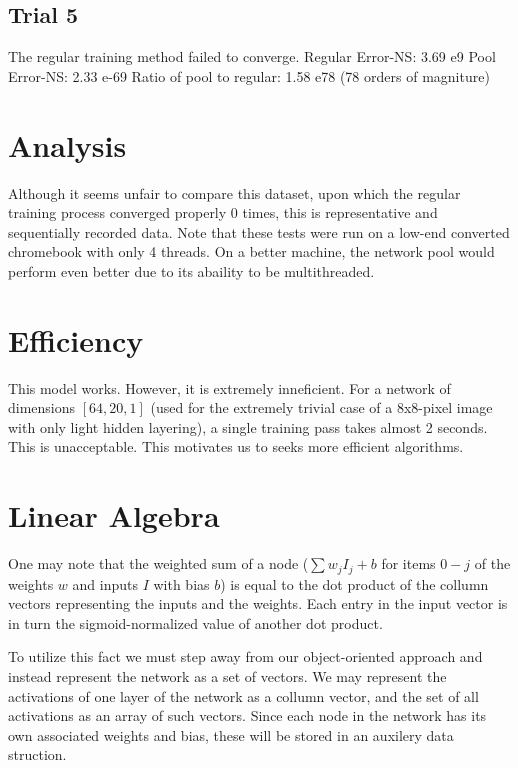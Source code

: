 \documentclass[8pt]{amsart}
\begin{document}
\subsection{Trial 5}

The regular training method failed to converge.
Regular Error-NS: 3.69 e9
Pool Error-NS: 2.33 e-69
Ratio of pool to regular: 1.58 e78 (78 orders of magniture)

\section{Analysis}

Although it seems unfair to compare this dataset, upon which the regular
training process converged properly 0 times, this is representative and
sequentially recorded data. Note that these tests were run on a low-end
converted chromebook with only 4 threads. On a better machine, the
network pool would perform even better due to its abaility to be multithreaded.

\section{Efficiency}

This model works. However, it is extremely inneficient. For a network
of dimensions $[64, 20, 1]$ (used for the extremely trivial case of a
8x8-pixel image with only light hidden layering), a single training pass
takes almost 2 seconds. This is unacceptable. This motivates us to seeks more
efficient algorithms.

\section{Linear Algebra}

One may note that the weighted sum of a node ($\sum{w_j I_j} + b$ for items $0-j$
of the weights $w$ and inputs $I$ with bias $b$) is equal to the dot product
of the collumn vectors representing the inputs and the weights. Each entry in
the input vector is in turn the sigmoid-normalized value of another dot product.

To utilize this fact we must step away from our object-oriented approach and
instead represent the network as a set of vectors. We may represent the activations
of one layer of the network as a collumn vector, and the set of all activations as
an array of such vectors. Since each node in the network has its own associated
weights and bias, these will be stored in an auxilery data struction.
\end{document}
